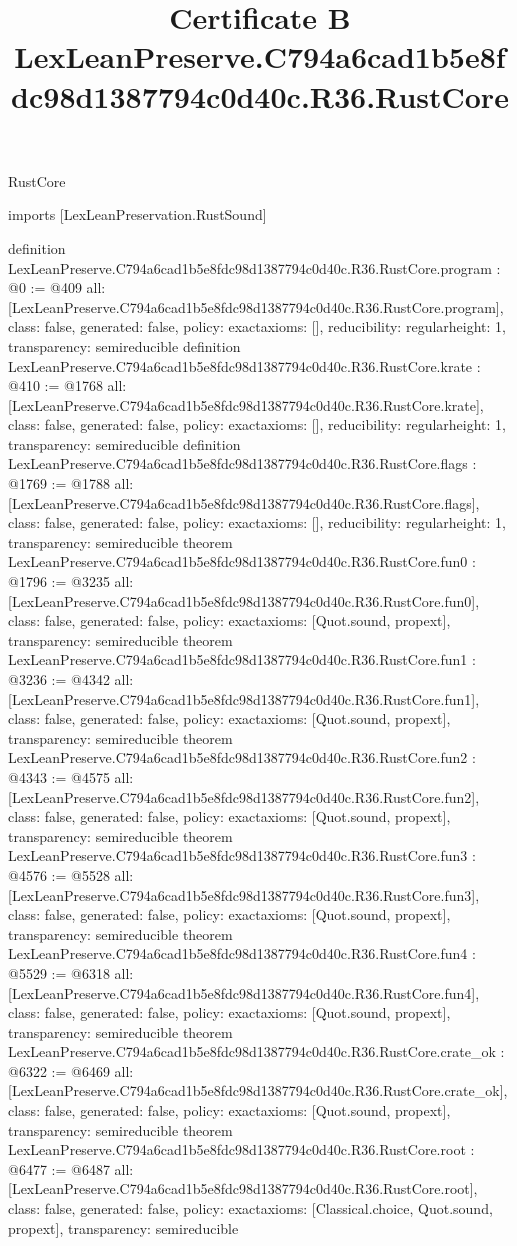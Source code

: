 \begin{lexlean}{RustCore}
\title{Certificate B LexLeanPreserve.C794a6cad1b5e8fdc98d1387794c0d40c.R36.RustCore}
\begin{coremodule}
imports [LexLeanPreservation.RustSound]

definition LexLeanPreserve.C794a6cad1b5e8fdc98d1387794c0d40c.R36.RustCore.program : @0 := @409 {
  all: [LexLeanPreserve.C794a6cad1b5e8fdc98d1387794c0d40c.R36.RustCore.program],
  class: false,
  generated: false,
  policy: exact{axioms: []},
  reducibility: regular{height: 1},
  transparency: semireducible
}
definition LexLeanPreserve.C794a6cad1b5e8fdc98d1387794c0d40c.R36.RustCore.krate : @410 := @1768 {
  all: [LexLeanPreserve.C794a6cad1b5e8fdc98d1387794c0d40c.R36.RustCore.krate],
  class: false,
  generated: false,
  policy: exact{axioms: []},
  reducibility: regular{height: 1},
  transparency: semireducible
}
definition LexLeanPreserve.C794a6cad1b5e8fdc98d1387794c0d40c.R36.RustCore.flags : @1769 := @1788 {
  all: [LexLeanPreserve.C794a6cad1b5e8fdc98d1387794c0d40c.R36.RustCore.flags],
  class: false,
  generated: false,
  policy: exact{axioms: []},
  reducibility: regular{height: 1},
  transparency: semireducible
}
theorem LexLeanPreserve.C794a6cad1b5e8fdc98d1387794c0d40c.R36.RustCore.fun0 : @1796 := @3235 {
  all: [LexLeanPreserve.C794a6cad1b5e8fdc98d1387794c0d40c.R36.RustCore.fun0],
  class: false,
  generated: false,
  policy: exact{axioms: [Quot.sound, propext]},
  transparency: semireducible
}
theorem LexLeanPreserve.C794a6cad1b5e8fdc98d1387794c0d40c.R36.RustCore.fun1 : @3236 := @4342 {
  all: [LexLeanPreserve.C794a6cad1b5e8fdc98d1387794c0d40c.R36.RustCore.fun1],
  class: false,
  generated: false,
  policy: exact{axioms: [Quot.sound, propext]},
  transparency: semireducible
}
theorem LexLeanPreserve.C794a6cad1b5e8fdc98d1387794c0d40c.R36.RustCore.fun2 : @4343 := @4575 {
  all: [LexLeanPreserve.C794a6cad1b5e8fdc98d1387794c0d40c.R36.RustCore.fun2],
  class: false,
  generated: false,
  policy: exact{axioms: [Quot.sound, propext]},
  transparency: semireducible
}
theorem LexLeanPreserve.C794a6cad1b5e8fdc98d1387794c0d40c.R36.RustCore.fun3 : @4576 := @5528 {
  all: [LexLeanPreserve.C794a6cad1b5e8fdc98d1387794c0d40c.R36.RustCore.fun3],
  class: false,
  generated: false,
  policy: exact{axioms: [Quot.sound, propext]},
  transparency: semireducible
}
theorem LexLeanPreserve.C794a6cad1b5e8fdc98d1387794c0d40c.R36.RustCore.fun4 : @5529 := @6318 {
  all: [LexLeanPreserve.C794a6cad1b5e8fdc98d1387794c0d40c.R36.RustCore.fun4],
  class: false,
  generated: false,
  policy: exact{axioms: [Quot.sound, propext]},
  transparency: semireducible
}
theorem LexLeanPreserve.C794a6cad1b5e8fdc98d1387794c0d40c.R36.RustCore.crate_ok : @6322 := @6469 {
  all: [LexLeanPreserve.C794a6cad1b5e8fdc98d1387794c0d40c.R36.RustCore.crate_ok],
  class: false,
  generated: false,
  policy: exact{axioms: [Quot.sound, propext]},
  transparency: semireducible
}
theorem LexLeanPreserve.C794a6cad1b5e8fdc98d1387794c0d40c.R36.RustCore.root : @6477 := @6487 {
  all: [LexLeanPreserve.C794a6cad1b5e8fdc98d1387794c0d40c.R36.RustCore.root],
  class: false,
  generated: false,
  policy: exact{axioms: [Classical.choice, Quot.sound, propext]},
  transparency: semireducible
}


\end{coremodule}
\end{lexlean}
